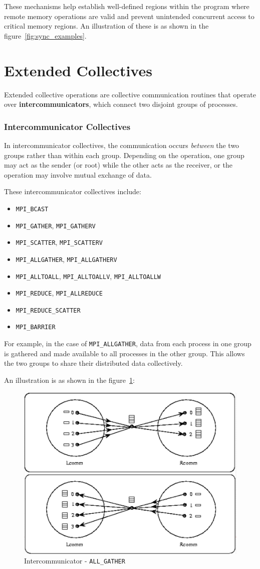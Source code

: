 \documentclass[12pt]{book}
\begin{document}
These mechanisms help establish well-defined regions within the program where remote memory operations are valid and prevent unintended concurrent access to critical memory regions. An illustration of these is as shown in the figure~\ref{fig:sync_examples}.

\section{Extended Collectives}
Extended collective operations are collective communication routines that operate over \textbf{intercommunicators}, which connect two disjoint groups of processes. 

\subsubsection{Intercommunicator Collectives}
In intercommunicator collectives, the communication occurs \emph{between} the two groups rather than within each group. Depending on the operation, one group may act as the sender (or root) while the other acts as the receiver, or the operation may involve mutual exchange of data.

These intercommunicator collectives include:
\begin{itemize}
    \item \texttt{MPI\_BCAST}
    \item \texttt{MPI\_GATHER}, \texttt{MPI\_GATHERV}
    \item \texttt{MPI\_SCATTER}, \texttt{MPI\_SCATTERV}
    \item \texttt{MPI\_ALLGATHER}, \texttt{MPI\_ALLGATHERV}
    \item \texttt{MPI\_ALLTOALL}, \texttt{MPI\_ALLTOALLV}, \texttt{MPI\_ALLTOALLW}
    \item \texttt{MPI\_REDUCE}, \texttt{MPI\_ALLREDUCE}
    \item \texttt{MPI\_REDUCE\_SCATTER}
    \item \texttt{MPI\_BARRIER}
\end{itemize}

For example, in the case of \texttt{MPI\_ALLGATHER}, data from each process in one group is gathered and made available to all processes in the other group. This allows the two groups to share their distributed data collectively.

An illustration is as shown in the figure~\ref{fig:allgatherinter}:
\begin{figure}
    \centering
    \includegraphics[width=0.5\linewidth]{images/extend_collect.png}
    \caption{Intercommunicator - \texttt{ALL\_GATHER}}
    \label{fig:allgatherinter}
\end{figure}
\end{document}
